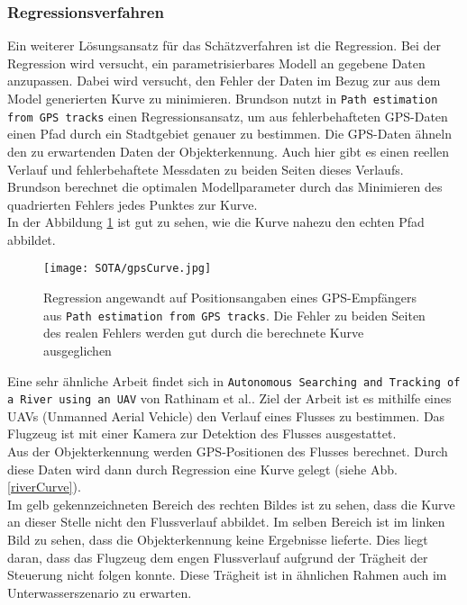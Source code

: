 \subsubsection{Regressionsverfahren}
Ein weiterer Lösungsansatz für das Schätzverfahren ist die Regression. Bei der Regression wird versucht, ein parametrisierbares Modell an gegebene Daten anzupassen. Dabei wird versucht, den Fehler der Daten im Bezug zur aus dem Model generierten Kurve zu minimieren.
Brundson nutzt in \texttt{Path estimation from GPS tracks}\cite{brunsdon2007path} einen Regressionsansatz, um aus fehlerbehafteten GPS-Daten einen Pfad durch ein Stadtgebiet genauer zu bestimmen. Die GPS-Daten ähneln den zu erwartenden Daten der Objekterkennung. Auch hier gibt es einen reellen Verlauf und fehlerbehaftete Messdaten zu beiden Seiten dieses Verlaufs.\\
Brundson berechnet die optimalen Modellparameter durch das Minimieren des quadrierten Fehlers jedes Punktes zur Kurve.\\
In der Abbildung \ref{gpsfit} ist gut zu sehen, wie die Kurve nahezu den echten Pfad abbildet.
\begin{figure}[H]
\centering
\texttt{[image: SOTA/gpsCurve.jpg]}
\caption[Abbildung eines Pfadverlaufs auf Basis von GPS-Daten.]{Regression angewandt auf Positionsangaben eines GPS-Empfängers aus \texttt{Path estimation from GPS tracks}\cite{brunsdon2007path}. Die Fehler zu beiden Seiten des realen Fehlers werden gut durch die berechnete Kurve ausgeglichen}
\label{gpsfit}
\end{figure}
Eine sehr ähnliche Arbeit findet sich in \texttt{Autonomous Searching and Tracking of a River using an UAV}\cite{rathinam2007autonomous} von Rathinam et al.. Ziel der Arbeit ist es mithilfe eines UAVs (Unmanned Aerial Vehicle) den Verlauf eines Flusses zu bestimmen. Das Flugzeug ist mit einer Kamera zur Detektion des Flusses ausgestattet.\\
Aus der Objekterkennung werden GPS-Positionen des Flusses berechnet. Durch diese Daten wird dann durch Regression eine Kurve gelegt (siehe Abb. \ref{riverCurve}).\\
Im gelb gekennzeichneten Bereich des rechten Bildes ist zu sehen, dass die Kurve an dieser Stelle nicht den Flussverlauf abbildet. Im selben Bereich ist im linken Bild zu sehen, dass die Objekterkennung keine Ergebnisse lieferte. Dies liegt daran, dass das Flugzeug dem engen Flussverlauf aufgrund der Trägheit der Steuerung nicht folgen konnte. Diese Trägheit ist in ähnlichen Rahmen auch im Unterwasserszenario zu erwarten.\\
